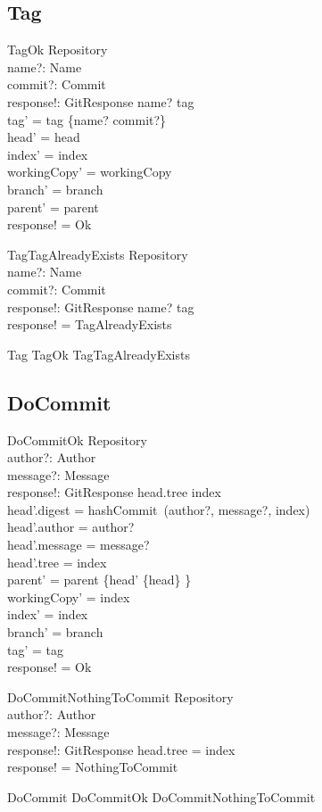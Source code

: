 \subsection{Tag}

\begin{schema}{TagOk}
	\Delta Repository \\
	name?: Name \\
	commit?: Commit \\
	response!: GitResponse
\where
	name? \notin \dom tag \\
	tag' = tag \cup \{name? \mapsto commit?\} \\
	head' = head \\
	index' = index \\
	workingCopy' = workingCopy \\
	branch' = branch \\
	parent' = parent \\
	response! = Ok
\end{schema}

\begin{schema}{TagTagAlreadyExists}
	\Xi Repository \\
	name?: Name \\
	commit?: Commit \\
	response!: GitResponse
\where
	name? \in \dom tag \\
  response! = TagAlreadyExists
\end{schema}

\begin{zed}
	Tag  TagOk \lor TagTagAlreadyExists
\end{zed}

\subsection{DoCommit}

\begin{schema}{DoCommitOk}
	\Delta Repository \\
	author?: Author \\
	message?: Message \\
	response!: GitResponse
\where
	head.tree \neq index \\
	head'.digest = hashCommit~(author?, message?, index) \\
	head'.author = author? \\
	head'.message = message? \\
	head'.tree = index \\
	parent' = parent \cup \{head' \mapsto \{head\} \} \\
	workingCopy' = index \\
	index' = index \\
	branch' = branch \\
	tag' = tag \\
	response! = Ok
\end{schema}

\begin{schema}{DoCommitNothingToCommit}
	\Xi Repository \\
	author?: Author \\
	message?: Message \\
	response!: GitResponse
\where
	head.tree = index \\
	response! = NothingToCommit
\end{schema}

\begin{zed}
	DoCommit  DoCommitOk \lor DoCommitNothingToCommit
\end{zed}
